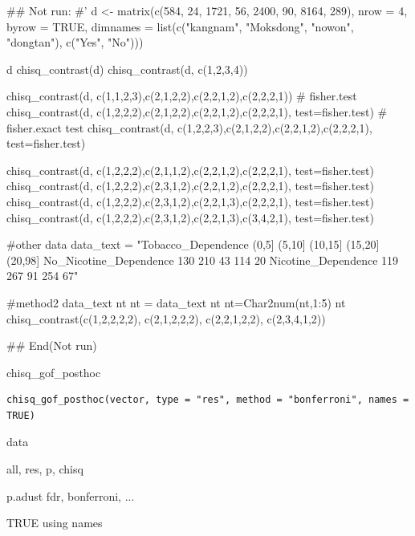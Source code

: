 \documentclass[a4paper]{book}
\begin{document}
\begin{Examples}
\begin{ExampleCode}

## Not run: 
#'
d <- matrix(c(584, 24, 1721, 56, 2400, 90, 8164, 289),
            nrow = 4, byrow = TRUE,
            dimnames = list(c("kangnam", "Moksdong", "nowon", "dongtan"), c("Yes", "No")))

d%
chisq_contrast(d)
chisq_contrast(d, c(1,2,3,4))


chisq_contrast(d, c(1,1,2,3),c(2,1,2,2),c(2,2,1,2),c(2,2,2,1))
# fisher.test
chisq_contrast(d, c(1,2,2,2),c(2,1,2,2),c(2,2,1,2),c(2,2,2,1), test=fisher.test)
# fisher.exact test
chisq_contrast(d, c(1,2,2,3),c(2,1,2,2),c(2,2,1,2),c(2,2,2,1), test=fisher.test)

chisq_contrast(d, c(1,2,2,2),c(2,1,1,2),c(2,2,1,2),c(2,2,2,1), test=fisher.test)
chisq_contrast(d, c(1,2,2,2),c(2,3,1,2),c(2,2,1,2),c(2,2,2,1), test=fisher.test)
chisq_contrast(d, c(1,2,2,2),c(2,3,1,2),c(2,2,1,3),c(2,2,2,1), test=fisher.test)
chisq_contrast(d, c(1,2,2,2),c(2,3,1,2),c(2,2,1,3),c(3,4,2,1), test=fisher.test)


#other data
data_text = "Tobacco_Dependence (0,5] (5,10] (10,15] (15,20] (20,98]
No_Nicotine_Dependence 130 210 43 114 20
Nicotine_Dependence 119 267 91 254 67"

#method2
data_text%
nt
nt = data_text%
nt %
nt=Char2num(nt,1:5)
nt%
  chisq_contrast(c(1,2,2,2,2),
                 c(2,1,2,2,2),
                 c(2,2,1,2,2),
                 c(2,3,4,1,2))

## End(Not run)


\end{ExampleCode}
\end{Examples}
%
\begin{Description}
chisq\_gof\_posthoc
\end{Description}
%
\begin{Usage}
\begin{verbatim}
chisq_gof_posthoc(vector, type = "res", method = "bonferroni", names = TRUE)
\end{verbatim}
\end{Usage}
%
\begin{Arguments}
\begin{ldescription}
\item[\code{vector}] data

\item[\code{type}] all, res, p, chisq

\item[\code{method}] p.adust fdr, bonferroni, ...

\item[\code{names}] TRUE using names
\end{ldescription}
\end{Arguments}
\end{document}
